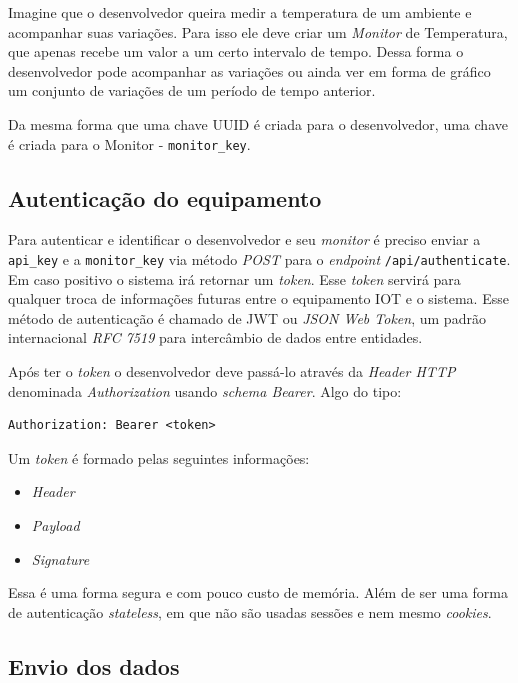 Imagine que o desenvolvedor queira medir a temperatura de um ambiente e
acompanhar suas variações. Para isso ele deve criar um \emph{Monitor} de
Temperatura, que apenas recebe um valor a um certo intervalo de tempo.
Dessa forma o desenvolvedor pode acompanhar as variações ou ainda ver em
forma de gráfico um conjunto de variações de um período de tempo
anterior.

Da mesma forma que uma chave UUID é criada para o desenvolvedor, uma
chave é criada para o Monitor - \texttt{monitor\_key}.

\subsection{Autenticação do
equipamento}\label{autenticauxe7uxe3o-do-equipamento}

Para autenticar e identificar o desenvolvedor e seu \emph{monitor} é
preciso enviar a \texttt{api\_key} e a \texttt{monitor\_key} via método
\emph{POST} para o \emph{endpoint} \texttt{/api/authenticate}. Em caso
positivo o sistema irá retornar um \emph{token}. Esse \emph{token}
servirá para qualquer troca de informações futuras entre o equipamento
IOT e o sistema. Esse método de autenticação é chamado de JWT ou
\emph{JSON Web Token}, um padrão internacional \emph{RFC 7519} para
intercâmbio de dados entre entidades.

Após ter o \emph{token} o desenvolvedor deve passá-lo através da
\emph{Header HTTP} denominada \emph{Authorization} usando \emph{schema
Bearer}. Algo do tipo:

\begin{verbatim}
Authorization: Bearer <token>
\end{verbatim}

Um \emph{token} é formado pelas seguintes informações:

\begin{itemize}
\itemsep1pt\parskip0pt
\item
  \emph{Header}
\item
  \emph{Payload}
\item
  \emph{Signature}
\end{itemize}

Essa é uma forma segura e com pouco custo de memória. Além de ser uma
forma de autenticação \emph{stateless}, em que não são usadas sessões e
nem mesmo \emph{cookies}.

\subsection{Envio dos dados}\label{envio-dos-dados}

